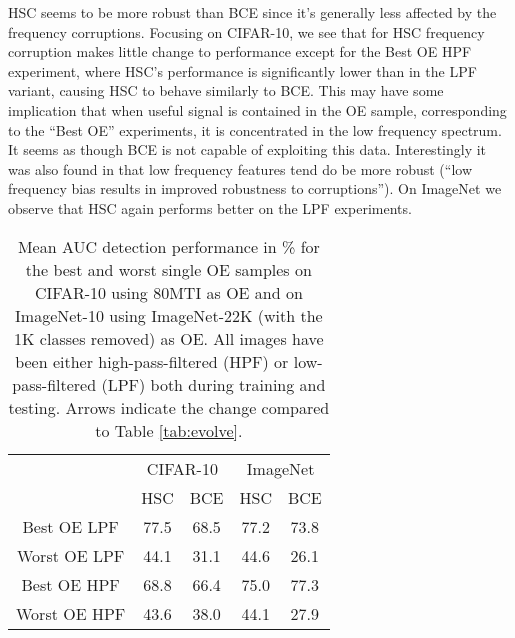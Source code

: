 \documentclass[10pt]{article} \usepackage[accepted]{stylefiles/tmlr}
\begin{document}
HSC seems to be more robust than BCE since it's generally less affected by the frequency corruptions. 
Focusing on CIFAR-10, we see that for HSC frequency corruption makes little change to performance except for the Best OE HPF experiment, where HSC's performance is significantly lower than in the LPF variant, causing HSC to behave similarly to BCE. 
This may have some implication that when useful signal is contained in the OE sample, corresponding to the ``Best OE'' experiments, it is concentrated in the low frequency spectrum. 
It seems as though BCE is not capable of exploiting this data. 
Interestingly it was also found in \citet{yin2019fourier} that low frequency features tend do be more robust (``low frequency bias results in improved robustness to corruptions'').
On ImageNet we observe that HSC again performs better on the LPF experiments.
\begin{table}[h]
  \caption{Mean AUC detection performance in \% for the best and worst single OE samples on CIFAR-10 using 80MTI as OE and on ImageNet-10 using ImageNet-22K (with the 1K classes removed) as OE. All images have been either high-pass-filtered (HPF) or low-pass-filtered (LPF) both during training and testing. Arrows indicate the change compared to Table \ref{tab:evolve}.}
  \label{tab:evolve_lpf_hpf}
  \begin{center}
    \small
    \begin{tabular}{ccccc} 
\toprule 
& \multicolumn{2}{c|}{CIFAR-10} & \multicolumn{2}{c}{ImageNet} \\ 
& HSC & \multicolumn{1}{c|}{BCE} & HSC & BCE \\ 
\midrule 
Best OE LPF & 77.5 & \multicolumn{1}{c|}{68.5} & 77.2 & 73.8 \\ 
Worst OE LPF & 44.1 & \multicolumn{1}{c|}{31.1} & 44.6 & 26.1 \\
Best OE HPF & 68.8& \multicolumn{1}{c|}{66.4} & 75.0 & 77.3 \\ 
Worst OE HPF & 43.6 & \multicolumn{1}{c|}{38.0} & 44.1 & 27.9 \\
\bottomrule 
\end{tabular} 

   \end{center}
\end{table}
\end{document}
